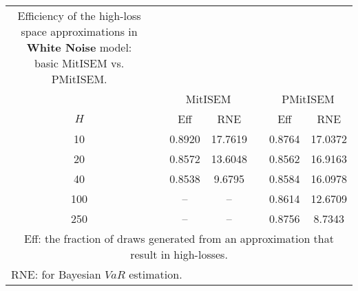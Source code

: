 { \renewcommand{\arraystretch}{1.2} 
\begin{longtable}{cc cc c cc} 
\caption{Efficiency of the high-loss space approximations in \textbf{White Noise} model:\\ basic MitISEM vs. PMitISEM.} 
\label{tab:effWN} \\ 
 && \multicolumn{2}{c}{MitISEM} && \multicolumn{2}{c}{PMitISEM} \\ \cline{3-4} \cline{6-7} 
 $H$ && Eff  & RNE && Eff & RNE  \\ \cline{1-1} \cline{3-4} \cline{6-7} 
10 & &0.8920 &  17.7619 && 0.8764 &  17.0372 \\ [1ex] 
20 & &0.8572 &  13.6048 && 0.8562 &  16.9163 \\ [1ex] 
40 & &0.8538 &  9.6795 && 0.8584 &  16.0978 \\ [1ex] 
100 & &-- & -- && 0.8614 &  12.6709 \\ [1ex] 
250 & &-- & -- && 0.8756 &  8.7343 \\ [1ex] 
\hline 
\multicolumn{7}{p{7cm}}{\footnotesize{Eff: the fraction of draws generated from an approximation that result in high-losses.}}  \\ 
\multicolumn{7}{l}{\footnotesize{RNE: for Bayesian $VaR$ estimation.}} 
\end{longtable} 
} 
